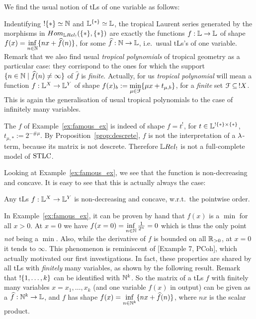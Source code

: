 We find the usual notion of tLs of one variable as follows:

\begin{remark}
 Indentifying $!\{*\}\simeq \mathbb{N}$ and $\mathbb{L}^{\{*\}}\simeq\mathbb{L}$, the tropical Laurent series generated by the morphisms in $\HOM{\LREL_!}{\set{*}}{\set{*}}$ are exactly the functions $f:\mathbb{L}\to\mathbb{L}$ of shape $f(x)=\inf\limits_{n\in\mathbb{N}}\{nx+\widehat f(n)\}$, for some $\widehat f:\mathbb{N}\to\mathbb{L}$, i.e.\ usual tLs's of one variable.
Remark that we also find usual \emph{tropical polynomials} of tropical geometry as a particular case: they corrispond to the ones for which the support $\{n\in\mathbb{N}\mid\widehat f(n)\neq\infty\}$ of $\widehat f$ is \emph{finite}.
Actually, for us \emph{tropical polynomial} will mean a function $f:\mathbb{L}^X\to\mathbb{L}^Y$ of shape $f(x)_b:=\min\limits_{\mu\in\mathcal{F}} \{\mu x+ t_{\mu,b}\}$, for a \emph{finite} set $\mathcal{F}\subseteq \, !X$.
This is again the generalisation of usual tropical polynomials to the case of infinitely many variables.
\end{remark}

\begin{remark}
 The $f$ of Example~\ref{ex:famous_ex} is indeed of shape $f=t^!$, for $t\in\mathbb{L}^{!\{*\}\times\{*\}}$, $t_{\mu,*}:=2^{-\# \mu}$.
 By Proposition~\ref{prop:descrete}, $f$ is not the interpretation of a $\lambda$-term, because its matrix is not descrete.
 Therefore $\LREL_!$ is not a full-complete model of $\mathrm{STLC}$.
\end{remark}

Looking at Example~\ref{ex:famous_ex}, we see that the function is non-decreasing and concave.
It is easy to see that this is actually always the case:

\begin{proposition}\label{prop:nondecr+conc}
 Any tLs $f:\mathbb{L}^X\to\mathbb{L}^Y$ is non-decreasing and concave, w.r.t.\ the pointwise order.
\end{proposition}

In Example~\ref{ex:famous_ex}, it can be proven by hand that $f(x)$ is a $\min$ for all $x>0$.
At $x=0$ we have $f(x=0)=\inf\limits_{n\in\mathbb{N}} \frac{1}{2^n}=0$ which is thus the only point \emph{not} being a $\min$.
Also, while the derivative of $f$ is bounded on all $\mathbb{R}_{>0}$, at $x=0$ it tends to $\infty$.
This phenomenon is reminiscent of [Example 7, PCoh],
which actually motivated our first investigations.
In fact, these properties are shared by all tLs with \emph{finitely} many variables, as shown by the following result.
Remark that $!\{1,\dots,k\}$ can be identified with $\mathbb{N}^k$.
So the matrix of a tLs $f$ with finitely many variables $x=x_1,\dots,x_k$ (and one variable $f(x)$ in output) can be given as a $\widehat f:\mathbb{N}^k\to\mathbb{L}$, and $f$ has shape $f(x)=\inf\limits_{n\in \mathbb{N}^k}\{nx+\widehat f(n)\}$, where $nx$ is the scalar product.

